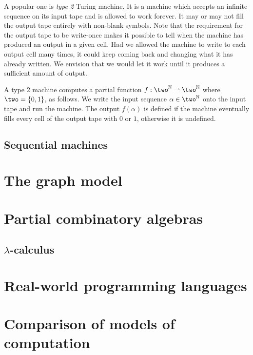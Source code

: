 A popular one is \emph{type 2} Turing machine. It is a machine which
accepts an infinite sequence on its input tape and is allowed to work
forever. It may or may not fill the output tape entirely with
non-blank symbols. Note that the requirement for the output tape to be
write-once makes it possible to tell when the machine has produced an
output in a given cell. Had we allowed the machine to write to each
output cell many times, it could keep coming back and changing what it
has already written. We envision that we would let it work until it
produces a sufficient amount of output.

A type 2 machine computes a partial function $f : \two^\NN \parto
\two^\NN$ where $\two = \set{0,1}$, as follows. We write the input
sequence $\alpha \in \two^\NN$ onto the input tape and run the
machine. The output $f(\alpha)$ is defined if the machine eventually
fills every cell of the output tape with $0$ or $1$, otherwise it is
undefined.


\subsection{Sequential machines}
\label{sec:sequential-machines}


\section{The graph model}
\label{sec:graph-model}


\section{Partial combinatory algebras}
\label{sec:pcas}

\subsection{$\lambda$-calculus}
\label{sec:lambda-calculus}




\section{Real-world programming languages}
\label{sec:programming-languages}


\section{Comparison of models of computation}
\label{sec:models-comparison}



